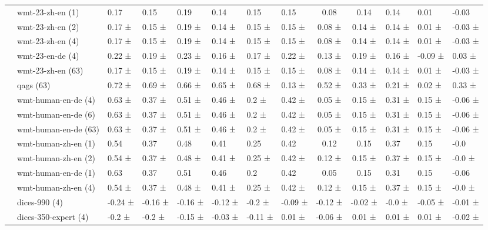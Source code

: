 \begin{tabular}{llllllll|cc}
 & wmt-23-zh-en (1) & 0.17  & 0.15  & 0.19  & 0.14  & 0.15  & 0.15  & 0.08  & 0.14  & 0.14  & 0.01  & -0.03  \\
 & wmt-23-zh-en (2) & 0.17 ± & 0.15 ± & 0.19 ± & 0.14 ± & 0.15 ± & 0.15 ± & 0.08 ± & 0.14 ± & 0.14 ± & 0.01 ± & -0.03 ± \\
 & wmt-23-zh-en (4) & 0.17 ± & 0.15 ± & 0.19 ± & 0.14 ± & 0.15 ± & 0.15 ± & 0.08 ± & 0.14 ± & 0.14 ± & 0.01 ± & -0.03 ± \\
 & wmt-23-en-de (4) & 0.22 ± & 0.19 ± & 0.23 ± & 0.16 ± & 0.17 ± & 0.22 ± & 0.13 ± & 0.19 ± & 0.16 ± & -0.09 ± & 0.03 ± \\
 & wmt-23-zh-en (63) & 0.17 ± & 0.15 ± & 0.19 ± & 0.14 ± & 0.15 ± & 0.15 ± & 0.08 ± & 0.14 ± & 0.14 ± & 0.01 ± & -0.03 ± \\
 & qags (63) & 0.72 ± & 0.69 ± & 0.66 ± & 0.65 ± & 0.68 ± & 0.13 ± & 0.52 ± & 0.33 ± & 0.21 ± & 0.02 ± & 0.33 ± \\
 & wmt-human-en-de (4) & 0.63 ± & 0.37 ± & 0.51 ± & 0.46 ± & 0.2 ± & 0.42 ± & 0.05 ± & 0.15 ± & 0.31 ± & 0.15 ± & -0.06 ± \\
 & wmt-human-en-de (6) & 0.63 ± & 0.37 ± & 0.51 ± & 0.46 ± & 0.2 ± & 0.42 ± & 0.05 ± & 0.15 ± & 0.31 ± & 0.15 ± & -0.06 ± \\
 & wmt-human-en-de (63) & 0.63 ± & 0.37 ± & 0.51 ± & 0.46 ± & 0.2 ± & 0.42 ± & 0.05 ± & 0.15 ± & 0.31 ± & 0.15 ± & -0.06 ± \\
 & wmt-human-zh-en (1) & 0.54  & 0.37  & 0.48  & 0.41  & 0.25  & 0.42  & 0.12  & 0.15  & 0.37  & 0.15  & -0.0  \\
 & wmt-human-zh-en (2) & 0.54 ± & 0.37 ± & 0.48 ± & 0.41 ± & 0.25 ± & 0.42 ± & 0.12 ± & 0.15 ± & 0.37 ± & 0.15 ± & -0.0 ± \\
 & wmt-human-en-de (1) & 0.63  & 0.37  & 0.51  & 0.46  & 0.2  & 0.42  & 0.05  & 0.15  & 0.31  & 0.15  & -0.06  \\
 & wmt-human-zh-en (4) & 0.54 ± & 0.37 ± & 0.48 ± & 0.41 ± & 0.25 ± & 0.42 ± & 0.12 ± & 0.15 ± & 0.37 ± & 0.15 ± & -0.0 ± \\
 & dices-990 (4) & -0.24 ± & -0.16 ± & -0.16 ± & -0.12 ± & -0.2 ± & -0.09 ± & -0.12 ± & -0.02 ± & -0.0 ± & -0.05 ± & -0.01 ± \\
 & dices-350-expert (4) & -0.2 ± & -0.2 ± & -0.15 ± & -0.03 ± & -0.11 ± & 0.01 ± & -0.06 ± & 0.01 ± & 0.01 ± & 0.01 ± & -0.02 ± \\

\end{tabular}
